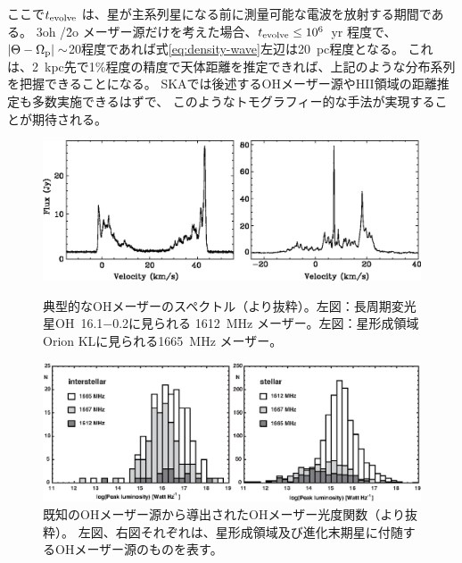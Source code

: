 \noindent ここで$t_{\rm evolve}$ は、星が主系列星になる前に測量可能な電波を放射する期間である。
\ch3oh /\h2o メーザー源だけを考えた場合、$t_{\rm evolve}\leq 10^6$~yr 程度で、
$\left|\Theta - \Omega_{\rm p}\right| \sim$20\kms 程度であれば式\ref{eq:density-wave}左辺は20~pc程度となる。
これは、2~kpc先で1\%程度の精度で天体距離を推定できれば、上記のような分布系列を把握できることになる。
SKAでは後述するOHメーザー源やH{\rm II}領域の距離推定も多数実施できるはずで、
このようなトモグラフィー的な手法が実現することが期待される。

\begin{figure}[t]
\begin{center}
\includegraphics[width=1.0\linewidth]{astrometry/OH_spectra_Etoka.eps}
\end{center}
\vspace{-7mm}
\caption{典型的なOHメーザーのスペクトル（\citealt{Etoka...2014}より抜粋）。左図：長周期変光星OH~16.1$-$0.2に見られる
1612~MHz メーザー。左図：星形成領域Orion KLに見られる1665~MHz メーザー。}\label{c7.s3.f10}
\vspace{3mm}
\includegraphics[width=1.0\linewidth]{astrometry/OH_LF_Etoka.eps}
\vspace{-7mm}
\caption{既知のOHメーザー源から導出されたOHメーザー光度関数（\citealt{Etoka...2014}より抜粋）。
左図、右図それぞれは、星形成領域及び進化末期星に付随するOHメーザー源のものを表す。}\label{c7.s3.f11}
\end{figure}

